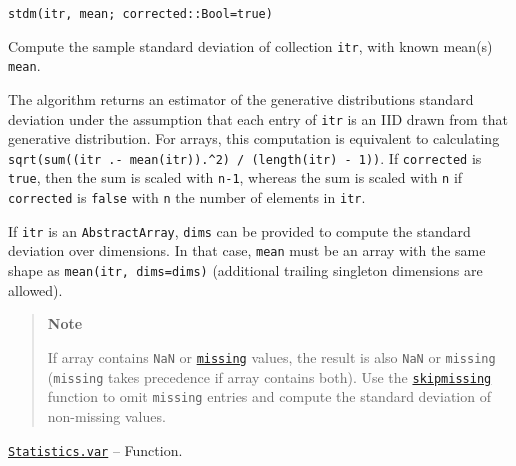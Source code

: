 \begin{adjustwidth}{2em}{0pt}


\begin{verbatim}
stdm(itr, mean; corrected::Bool=true)
\end{verbatim}

Compute the sample standard deviation of collection \texttt{itr}, with known mean(s) \texttt{mean}.

The algorithm returns an estimator of the generative distribution{\textquotesingle}s standard deviation under the assumption that each entry of \texttt{itr} is an IID drawn from that generative distribution. For arrays, this computation is equivalent to calculating \texttt{sqrt(sum((itr .- mean(itr)).{\textasciicircum}2) / (length(itr) - 1))}. If \texttt{corrected} is \texttt{true}, then the sum is scaled with \texttt{n-1}, whereas the sum is scaled with \texttt{n} if \texttt{corrected} is \texttt{false} with \texttt{n} the number of elements in \texttt{itr}.

If \texttt{itr} is an \texttt{AbstractArray}, \texttt{dims} can be provided to compute the standard deviation over dimensions. In that case, \texttt{mean} must be an array with the same shape as \texttt{mean(itr, dims=dims)} (additional trailing singleton dimensions are allowed).

\begin{quote}
\textbf{Note}

If array contains \texttt{NaN} or \hyperlink{14596725676261444434}{\texttt{missing}} values, the result is also \texttt{NaN} or \texttt{missing} (\texttt{missing} takes precedence if array contains both). Use the \hyperlink{2012470681884771400}{\texttt{skipmissing}} function to omit \texttt{missing} entries and compute the standard deviation of non-missing values.

\end{quote}


\end{adjustwidth}
\hypertarget{3113715888143479678}{}
\hyperlink{3113715888143479678}{\texttt{Statistics.var}}  -- {Function.}

